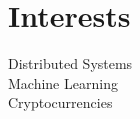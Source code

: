 \documentclass[letterpaper]{deedy-resume} %
\begin{document}
\begin{minipage}[t]{0.33\textwidth}

\section{Interests}
Distributed Systems \\
Machine Learning \\
Cryptocurrencies

\sectionspace %


\end{minipage} %
\hfill
%
%
\end{document}
